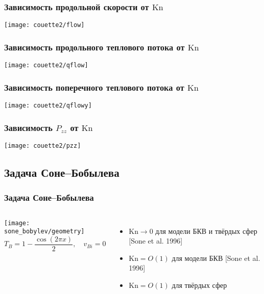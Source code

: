 \documentclass[mathserif]{beamer} %
\newcommand{\Kn}{\mathrm{Kn}}
\newcommand{\OO}[1]{O(#1)}
\begin{document}
\begin{frame}
    \frametitle{Зависимость продольной скорости от \(\Kn\)}
    \vspace{-2pt}
    \centering\hspace{-1.5cm}
    \texttt{[image: couette2/flow]}
    \hspace{-1.5cm}
\end{frame}

\begin{frame}
    \frametitle{Зависимость продольного теплового потока от \(\Kn\)}
    \vspace{-2pt}
    \centering\hspace{-1.5cm}
    \texttt{[image: couette2/qflow]}
    \hspace{-1.5cm}
\end{frame}

\begin{frame}
    \frametitle{Зависимость поперечного теплового потока от \(\Kn\)}
    \vspace{-2pt}
    \centering\hspace{-1.5cm}
    \texttt{[image: couette2/qflowy]}
    \hspace{-1.5cm}
\end{frame}

\begin{frame}
    \frametitle{Зависимость \(P_{zz}\) от \(\Kn\)}
    \vspace{-2pt}
    \centering\hspace{-1.5cm}
    \texttt{[image: couette2/pzz]}
    \hspace{-1.5cm}
\end{frame}

\subsection{Задача Соне--Бобылева}

\begin{frame}
    \frametitle{Задача Соне--Бобылева}
    \begin{columns}
        \hspace{-10pt}\texttt{[image: sone\_bobylev/geometry]}
        \[ T_B = 1 - \frac{\cos(2\pi x)}{2}, \quad v_{Bi} = 0 \]
        \begin{itemize}
            \item \(\Kn\to0\) для модели БКВ и твёрдых сфер [Sone et al. 1996]
            \smallskip
            \item \(\Kn=\OO{1}\) для модели БКВ [Sone et al. 1996]
            \smallskip
            \item \(\Kn=\OO{1}\) для твёрдых сфер
        \end{itemize}
    \end{columns}
\end{frame}
\end{document}
